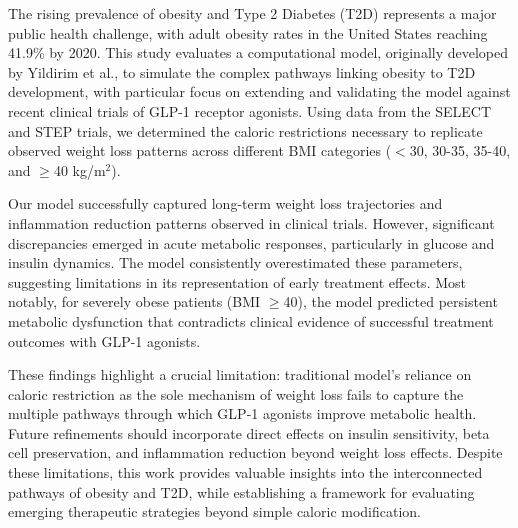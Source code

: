 The rising prevalence of obesity and Type 2 Diabetes (T2D) represents a major public health challenge, with adult obesity rates in the United States reaching 41.9\% by 2020. This study evaluates a computational model, originally developed by Yildirim et al.\cite{Yildirim2023}, to simulate the complex pathways linking obesity to T2D development, with particular focus on extending and validating the model against recent clinical trials of GLP-1 receptor agonists. Using data from the SELECT and STEP trials, we determined the caloric restrictions necessary to replicate observed weight loss patterns across different BMI categories ($<$30, 30-35, 35-40, and $\geq$40 kg/m$^2$).

Our model successfully captured long-term weight loss trajectories and inflammation reduction patterns observed in clinical trials. However, significant discrepancies emerged in acute metabolic responses, particularly in glucose and insulin dynamics. The model consistently overestimated these parameters, suggesting limitations in its representation of early treatment effects. Most notably, for severely obese patients (BMI $\geq$40), the model predicted persistent metabolic dysfunction that contradicts clinical evidence of successful treatment outcomes with GLP-1 agonists.

These findings highlight a crucial limitation: traditional model's reliance on caloric restriction as the sole mechanism of weight loss fails to capture the multiple pathways through which GLP-1 agonists improve metabolic health. Future refinements should incorporate direct effects on insulin sensitivity, beta cell preservation, and inflammation reduction beyond weight loss effects. Despite these limitations, this work provides valuable insights into the interconnected pathways of obesity and T2D, while establishing a framework for evaluating emerging therapeutic strategies beyond simple caloric modification.
